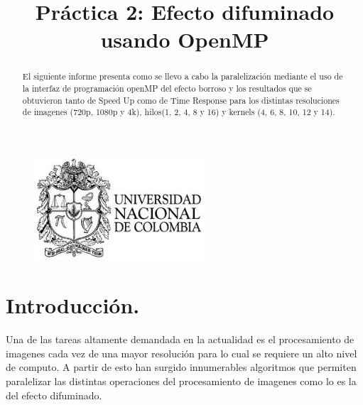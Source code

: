 \documentclass{IEEEtran}
\begin{document}
%
\title{Práctica 2: Efecto difuminado usando OpenMP}


\author{
}


\maketitle

\begin{figure}[!t]
\centering
\includegraphics[width=2.5in]{logo_unal}
\label{fig_sim}
\end{figure}
\begin{abstract}
El siguiente informe presenta como se llevo a cabo la paralelización
 mediante el uso de la interfaz de programación openMP 
 del efecto borroso y los resultados que se obtuvieron tanto de
 Speed Up como de Time Response para los distintas resoluciones
 de imagenes (720p, 1080p y 4k), hilos(1, 2, 4, 8 y 16) y kernels 
 (4, 6, 8, 10, 12 y 14).
\end{abstract}



\IEEEpeerreviewmaketitle



\section{Introducción.}
Una de las tareas altamente demandada en la actualidad 
es el procesamiento de imagenes cada vez de una mayor 
resolución para lo cual se requiere un alto nivel de computo.
 A partir de esto han surgido innumerables algoritmos que permiten
  paralelizar las distintas operaciones del procesamiento de 
  imagenes como lo es la del efecto difuminado.\\
\end{document}
